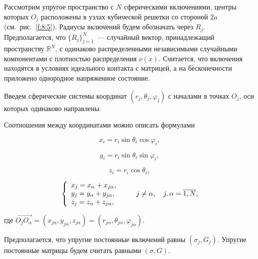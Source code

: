 Рассмотрим упругое пространство с $N$ сферическими включениями, центры которых $O_j$ расположены в узлах кубической решетки со стороной $2a$ (см.~рис.~\ref{f:8:5}). Радиусы включений будем обозначать через $R_j$. Предполагается, что $\{R_j\}_{j=1}^N$~--- случайный вектор, принадлежащий пространству $\mathbb{R}^N$, с одинаково распределенными независимыми случайными компонентами с плотностью распределения $\nu(x)$. Считается, что включения находятся в условиях идеального контакта с матрицей, а на бесконечности приложено однородное напряженное состояние.


Введем сферические системы координат $(r_j,\theta_j,\varphi_j)$ с началами в точках $O_j$, оси которых одинаково направлены.

Соотношения между координатами можно описать формулами

\begin{equation*}
{x_i} = {r_i}\sin {\theta _i}\cos {\varphi _i},
\end{equation*}

\begin{equation}
{y_i} = {r_i}\sin {\theta _i}\sin {\varphi _i},
\label{eq:8:1}
\end{equation}

\begin{equation*}
{z_i} = {r_i}\cos {\theta _i},
\end{equation*}

\begin{equation}
\left\{ {\begin{array}{*{20}{l}}
{{x_j} = {x_\alpha } + {x_{j\alpha }},}\\
{{y_j} = {y_\alpha } + {y_{j\alpha }},}\\
{{z_j} = {z_\alpha } + {z_{j\alpha }},}
\end{array}} \right.\qquad {\kern 1pt} j \ne \alpha ,\quad j,\alpha  = \overline {1,N},
\label{eq:8:2}
\end{equation}

\noindent где $\overrightarrow {{O_j}{O_\alpha }}  = \left( {{x_{j\alpha }},{y_{j\alpha }},{z_{j\alpha }}} \right) = \left( {{r_{j\alpha }},{\theta _{j\alpha }},{\varphi _{j\alpha }}} \right)$.

Предполагается, что упругие постоянные включений равны $(\sigma_j,G_j)$. Упругие постоянные матрицы будем считать равными $(\sigma,G)$.

